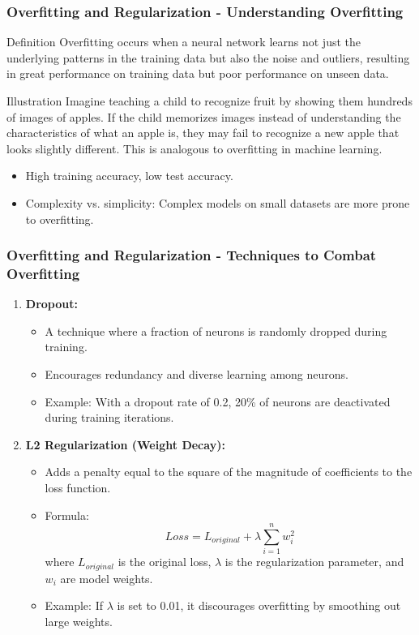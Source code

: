 \documentclass[aspectratio=169]{beamer}
\begin{document}
\begin{frame}[fragile]
    \frametitle{Overfitting and Regularization - Understanding Overfitting}
    \begin{block}{Definition}
        Overfitting occurs when a neural network learns not just the underlying patterns in the training data but also the noise and outliers, resulting in great performance on training data but poor performance on unseen data.
    \end{block}
    
    \begin{block}{Illustration}
        Imagine teaching a child to recognize fruit by showing them hundreds of images of apples. If the child memorizes images instead of understanding the characteristics of what an apple is, they may fail to recognize a new apple that looks slightly different. This is analogous to overfitting in machine learning.
    \end{block}
    
    \begin{itemize}
        \item High training accuracy, low test accuracy.
        \item Complexity vs. simplicity: Complex models on small datasets are more prone to overfitting.
    \end{itemize}
\end{frame}

\begin{frame}[fragile]
    \frametitle{Overfitting and Regularization - Techniques to Combat Overfitting}
    \begin{enumerate}
        \item \textbf{Dropout:}
            \begin{itemize}
                \item A technique where a fraction of neurons is randomly dropped during training.
                \item Encourages redundancy and diverse learning among neurons.
                \item Example: With a dropout rate of 0.2, 20\% of neurons are deactivated during training iterations.
            \end{itemize}
        
        \item \textbf{L2 Regularization (Weight Decay):}
            \begin{itemize}
                \item Adds a penalty equal to the square of the magnitude of coefficients to the loss function.
                \item Formula: 
                \[
                Loss = L_{original} + \lambda \sum_{i=1}^{n} w_i^2
                \]
                where \(L_{original}\) is the original loss, \( \lambda \) is the regularization parameter, and \( w_i \) are model weights.
                \item Example: If \( \lambda \) is set to 0.01, it discourages overfitting by smoothing out large weights.
            \end{itemize}
    \end{enumerate}
\end{frame}
\end{document}
